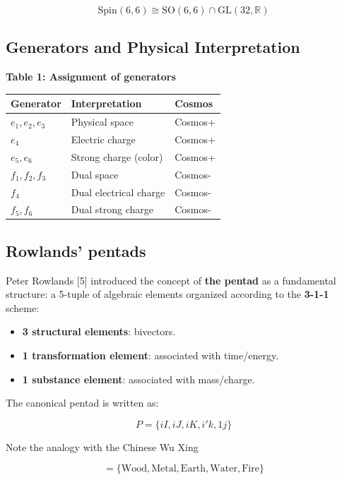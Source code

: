 \documentclass[11pt]{article}
\providecommand{\tightlist}{%
\setlength{\itemsep}{2pt}\setlength{\parskip}{6pt}
}
\begin{document}
\[\text{Spin}(6,6) \cong \text{SO}(6,6) \cap \text{GL}(32, \mathbb{R})\]

\hypertarget{generators-and-physical-interpretation}{%
\subsection{Generators and Physical
Interpretation}\label{generators-and-physical-interpretation}}

\textbf{Table 1: Assignment of generators}

\begin{longtable}[]{@{}lll@{}}
\toprule
Generator & Interpretation & Cosmos \\
\midrule
\endhead
\(e_1, e_2, e_3\) & Physical space & Cosmos+ \\
\(e_4\) & Electric charge & Cosmos+ \\
\(e_5, e_6\) & Strong charge (color) & Cosmos+ \\
\(f_1, f_2, f_3\) & Dual space & Cosmos- \\
\(f_4\) & Dual electrical charge & Cosmos- \\
\(f_5, f_6\) & Dual strong charge & Cosmos- \\
\bottomrule
\end{longtable}

\hypertarget{rowlands-pentads}{%
\subsection{Rowlands' pentads}\label{rowlands-pentads}}

Peter Rowlands {[}5{]} introduced the concept of \textbf{the pentad} as
a fundamental structure: a 5-tuple of algebraic elements organized
according to the \textbf{3-1-1} scheme:

\begin{itemize}
\tightlist
\item
  \textbf{3 structural elements}: bivectors.
\item
  \textbf{1 transformation element}: associated with time/energy.
\item
  \textbf{1 substance element}: associated with mass/charge.
\end{itemize}

The canonical pentad is written as:

\[P = \{ iI, iJ, iK, i'k, 1j \}\]

Note the analogy with the Chinese Wu Xing

\[ = \{ \text{Wood}, \text{Metal}, \text{Earth}, \text{Water}, \text{Fire} \}\]
\end{document}
